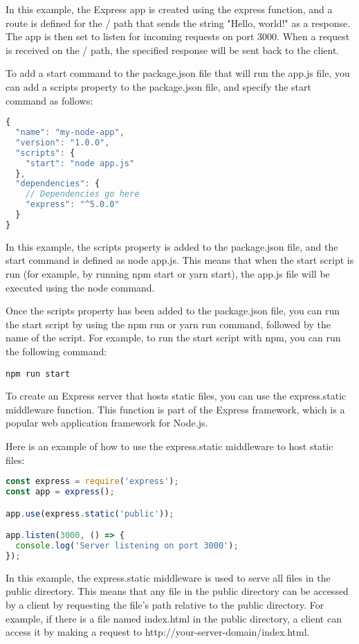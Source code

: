 {In this example, the Express app is created using the express function, and a route is defined for the / path that sends the string "Hello, world!" as a response. The app is then set to listen for incoming requests on port 3000. When a request is received on the / path, the specified response will be sent back to the client.

To add a start command to the package.json file that will run the app.js file, you can add a scripts property to the package.json file, and specify the start command as follows:

\begin{lstlisting}[language=Javascript]
{
  "name": "my-node-app",
  "version": "1.0.0",
  "scripts": {
    "start": "node app.js"
  },
  "dependencies": {
    // Dependencies go here
    "express": "^5.0.0"
  }
}
\end{lstlisting}

In this example, the scripts property is added to the package.json file, and the start command is defined as node app.js. This means that when the start script is run (for example, by running npm start or yarn start), the app.js file will be executed using the node command.

Once the scripts property has been added to the package.json file, you can run the start script by using the npm run or yarn run command, followed by the name of the script. For example, to run the start script with npm, you can run the following command:

\begin{verbatim}
npm run start
\end{verbatim}

To create an Express server that hosts static files, you can use the express.static middleware function. This function is part of the Express framework, which is a popular web application framework for Node.js.

Here is an example of how to use the express.static middleware to host static files:

\begin{lstlisting}[language=Javascript, caption=Static files in express]
const express = require('express');
const app = express();

app.use(express.static('public'));

app.listen(3000, () => {
  console.log('Server listening on port 3000');
});

\end{lstlisting}
In this example, the express.static middleware is used to serve all files in the public directory. This means that any file in the public directory can be accessed by a client by requesting the file's path relative to the public directory. For example, if there is a file named index.html in the public directory, a client can access it by making a request to http://your-server-domain/index.html.

}
